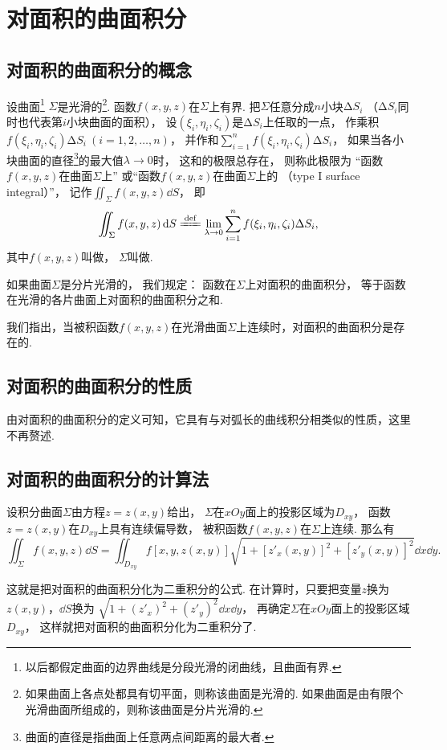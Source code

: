 \section{对面积的曲面积分}
\subsection{对面积的曲面积分的概念}
\begin{definition}
设曲面\footnote{以后都假定曲面的边界曲线是分段光滑的闭曲线，且曲面有界.}%
\(\Sigma\)是光滑的\footnote{如果曲面上各点处都具有切平面，则称该曲面是光滑的.
如果曲面是由有限个光滑曲面所组成的，则称该曲面是分片光滑的.}.
函数\(f(x,y,z)\)在\(\Sigma\)上有界.
把\(\Sigma\)任意分成\(n\)小块\(\increment S_i\)
（\(\increment S_i\)同时也代表第\(i\)小块曲面的面积），
设\((\xi_i,\eta_i,\zeta_i)\)是\(\increment S_i\)上任取的一点，
作乘积\(f(\xi_i,\eta_i,\zeta_i) \increment S_i\ (i=1,2,\dotsc,n)\)，
并作和\(\sum_{i=1}^n f(\xi_i,\eta_i,\zeta_i) \increment S_i\)，
如果当各小块曲面的直径\footnote{%
曲面的直径是指曲面上任意两点间距离的最大者.}的最大值\(\lambda\to0\)时，
这和的极限总存在，
则称此极限为
“函数\(f(x,y,z)\)在曲面\(\Sigma\)上”
或“函数\(f(x,y,z)\)在曲面\(\Sigma\)上的%
（type I surface integral）”，
记作\(\iint_\Sigma f(x,y,z) \dd{S}\)，
即\[
	\iint_\Sigma f(x,y,z)\dd{S}
	\defeq
	\lim_{\lambda\to0} \sum_{i=1}^n f(\xi_i,\eta_i,\zeta_i) \increment S_i,
\]
其中\(f(x,y,z)\)叫做，
\(\Sigma\)叫做.

如果曲面\(\Sigma\)是分片光滑的，
我们规定：
函数在\(\Sigma\)上对面积的曲面积分，
等于函数在光滑的各片曲面上对面积的曲面积分之和.
\end{definition}
我们指出，当被积函数\(f(x,y,z)\)在光滑曲面\(\Sigma\)上连续时，对面积的曲面积分是存在的.

\subsection{对面积的曲面积分的性质}
由对面积的曲面积分的定义可知，它具有与对弧长的曲线积分相类似的性质，这里不再赘述.

\subsection{对面积的曲面积分的计算法}
\begin{theorem}
设积分曲面\(\Sigma\)由方程\(z=z(x,y)\)给出，
\(\Sigma\)在\(xOy\)面上的投影区域为\(D_{xy}\)，
函数\(z=z(x,y)\)在\(D_{xy}\)上具有连续偏导数，
被积函数\(f(x,y,z)\)在\(\Sigma\)上连续.
那么有\[
	\iint_\Sigma f(x,y,z) \dd{S}
	=\iint_{D_{xy}} f[x,y,z(x,y)] \sqrt{1+[z'_x(x,y)]^2+[z'_y(x,y)]^2} \dd{x}\dd{y}.
\]
\end{theorem}
这就是把对面积的曲面积分化为二重积分的公式.
在计算时，只要把变量\(z\)换为\(z(x,y)\)，\(\dd{S}\)换为
\(\sqrt{1+(z'_x)^2+(z'_y)^2} \dd{x}\dd{y}\)，
再确定\(\Sigma\)在\(xOy\)面上的投影区域\(D_{xy}\)，
这样就把对面积的曲面积分化为二重积分了.

